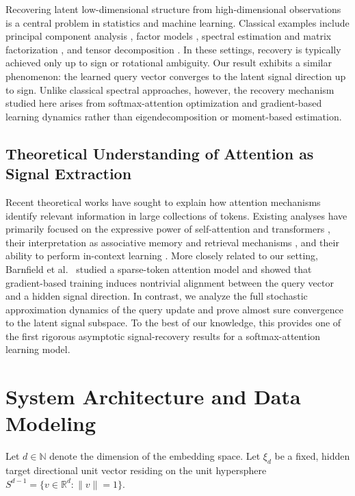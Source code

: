 \documentclass[11pt,a4paper]{article}
\theoremstyle{definition}
\begin{document}
Recovering latent low-dimensional structure from high-dimensional observations is a central problem in statistics and machine learning. Classical examples include principal component analysis \cite{jolliffe2002principal,johnstone2001distribution}, factor models \cite{bai2003inferential}, spectral estimation and matrix factorization \cite{udell2016generalized}, and tensor decomposition \cite{kolda2009tensor,anandkumar2014tensor}. In these settings, recovery is typically achieved only up to sign or rotational ambiguity. Our result exhibits a similar phenomenon: the learned query vector converges to the latent signal direction up to sign. Unlike classical spectral approaches, however, the recovery mechanism studied here arises from softmax-attention optimization and gradient-based learning dynamics rather than eigendecomposition or moment-based estimation.

\subsection{Theoretical Understanding of Attention as Signal Extraction}

Recent theoretical works have sought to explain how attention mechanisms identify relevant information in large collections of tokens. Existing analyses have primarily focused on the expressive power of self-attention and transformers \cite{yun2020transformers,likhosherstov2021expressive,perez2019turing}, their interpretation as associative memory and retrieval mechanisms \cite{ramsauer2021hopfield}, and their ability to perform in-context learning \cite{garg2022can, vonoswald2023transformers}. More closely related to our setting, Barnfield et al.~\cite{barnfield2025sparse} studied a sparse-token attention model and showed that gradient-based training induces nontrivial alignment between the query vector and a hidden signal direction. In contrast, we analyze the full stochastic approximation dynamics of the query update and prove almost sure convergence to the latent signal subspace. To the best of our knowledge, this provides one of the first rigorous asymptotic signal-recovery results for a softmax-attention learning model.

\section{System Architecture and Data Modeling}
Let $d \in \mathbb{N}$ denote the dimension of the embedding space. Let $\xi_{d}$ be a fixed, hidden target directional unit vector residing on the unit hypersphere $S^{d-1} = \{ v \in \mathbb{R}^d : \|v\| = 1 \}$.
\end{document}
